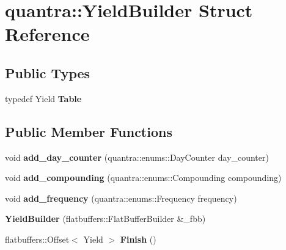 \hypertarget{structquantra_1_1YieldBuilder}{}\section{quantra\+:\+:Yield\+Builder Struct Reference}
\label{structquantra_1_1YieldBuilder}
\subsection*{Public Types}
\begin{DoxyCompactItemize}
\item 
\mbox{\label{structquantra_1_1YieldBuilder_a002565faca6b7d8bf9eb0db858131d01}} 
typedef Yield {\bfseries Table}
\end{DoxyCompactItemize}
\subsection*{Public Member Functions}
\begin{DoxyCompactItemize}
\item 
\mbox{\label{structquantra_1_1YieldBuilder_acc91a37236cb18d862a98ad9e5b44251}} 
void {\bfseries add\+\_\+day\+\_\+counter} (quantra\+::enums\+::\+Day\+Counter day\+\_\+counter)
\item 
\mbox{\label{structquantra_1_1YieldBuilder_a2b6c644999a9d064c1a1eeb392a4c685}} 
void {\bfseries add\+\_\+compounding} (quantra\+::enums\+::\+Compounding compounding)
\item 
\mbox{\label{structquantra_1_1YieldBuilder_a67b68246c1791c54b765667fa16dc0d7}} 
void {\bfseries add\+\_\+frequency} (quantra\+::enums\+::\+Frequency frequency)
\item 
\mbox{\label{structquantra_1_1YieldBuilder_a7d53cbb30c082ce51762275a4a0fccc7}} 
{\bfseries Yield\+Builder} (flatbuffers\+::\+Flat\+Buffer\+Builder \&\+\_\+fbb)
\item 
\mbox{\label{structquantra_1_1YieldBuilder_af017a2d8511a3aa2ac1a6ffb8bc24eec}} 
flatbuffers\+::\+Offset$<$ Yield $>$ {\bfseries Finish} ()
\end{DoxyCompactItemize}
